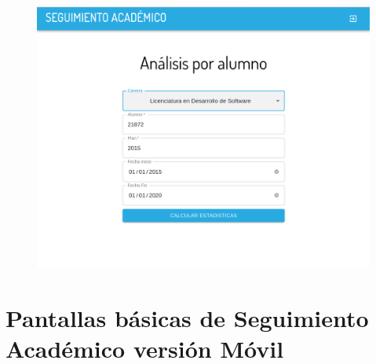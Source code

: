 \begin{figure}[!htbp]
  \centering
    \includegraphics[scale=0.3]{images/seguimiento-academico/sa-form-alumno.png}
  \label{fig:sa-alumno}
\end{figure}


\section{Pantallas básicas de Seguimiento Académico versión Móvil}

